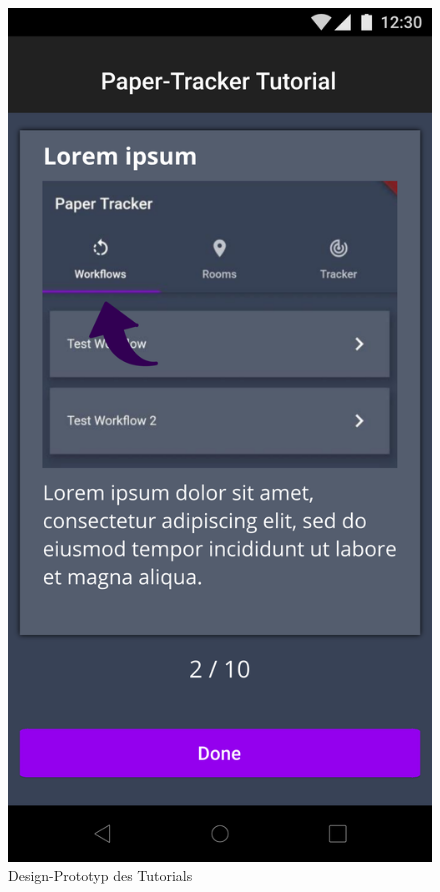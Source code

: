 \begin{figure}[h!tbp]
	\includegraphics[height=.6\textheight]{images/ui-prototype/tutorial.png}
	\centering
	\caption{Design-Prototyp des Tutorials}
	\label{fig:ui-tutorial}
\end{figure}


